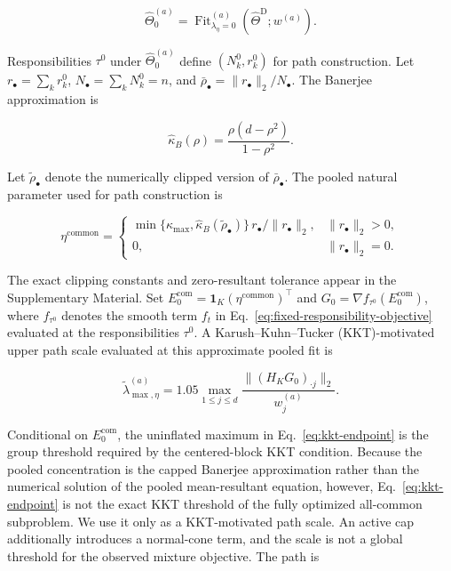 \documentclass[preprint,12pt,authoryear]{elsarticle}
\begin{document}
\[
\widehat\Theta_0^{(a)}
=\operatorname{Fit}_{\lambda_\eta=0}^{(a)}
\left(\widehat\Theta^{\mathrm D};w^{(a)}\right).
\]

Responsibilities $\tau^0$ under $\widehat\Theta_0^{(a)}$ define
$(N_k^0,r_k^0)$ for path construction. Let
$r_\bullet=\sum_k r_k^0$, $N_\bullet=\sum_kN_k^0=n$, and
$\bar\rho_\bullet=\lVert r_\bullet\rVert_2/N_\bullet$. The Banerjee
approximation \citep[Eq.~(4.4)]{banerjee2005vmf} is

\begin{equation}
\label{eq:banerjee-pooled}
\widehat\kappa_B(\rho)
=\frac{\rho(d-\rho^2)}{1-\rho^2}.
\end{equation}

Let $\widetilde\rho_\bullet$ denote the numerically clipped version of
$\bar\rho_\bullet$. The pooled natural parameter used for path construction is

\[
\eta^{\mathrm{common}}
=
\begin{cases}
\min\{\kappa_{\max},\widehat\kappa_B(\widetilde\rho_\bullet)\}
\,r_\bullet/\lVert r_\bullet\rVert_2,
& \lVert r_\bullet\rVert_2>0,\\[3pt]
0, & \lVert r_\bullet\rVert_2=0.
\end{cases}
\]

The exact clipping constants and zero-resultant tolerance appear in the
Supplementary Material. Set
$E_0^{\mathrm{com}}=\mathbf 1_K(\eta^{\mathrm{common}})^\top$ and
$G_0=\nabla f_{\tau^0}(E_0^{\mathrm{com}})$, where $f_{\tau^0}$ denotes the
smooth term $f_t$ in Eq.~\eqref{eq:fixed-responsibility-objective} evaluated
at the responsibilities $\tau^0$. A Karush--Kuhn--Tucker (KKT)-motivated
upper path scale evaluated at this approximate pooled fit is

\begin{equation}
\label{eq:kkt-endpoint}
\widetilde\lambda_{\max,\eta}^{(a)}
=1.05\max_{1\leq j\leq d}
\frac{\lVert (H_KG_0)_{\cdot j}\rVert_2}{w_j^{(a)}}.
\end{equation}

Conditional on $E_0^{\mathrm{com}}$, the uninflated maximum in
Eq.~\eqref{eq:kkt-endpoint} is the group threshold required by the
centered-block KKT condition. Because the pooled concentration is the capped Banerjee
approximation rather than the numerical solution of the pooled mean-resultant
equation, however, Eq.~\eqref{eq:kkt-endpoint} is not the exact KKT threshold
of the fully optimized all-common subproblem. We use it only as a
KKT-motivated path scale. An active cap additionally introduces a normal-cone
term, and the scale is not a global threshold for the observed mixture
objective. The path is
\end{document}
